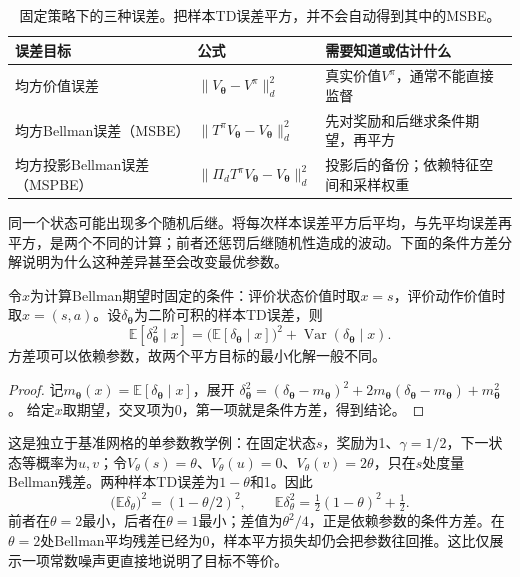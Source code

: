\begin{table}[t]
  \centering
  \small
  \begin{tabularx}{\linewidth}{>{\raggedright\arraybackslash}p{30mm} >{\raggedright\arraybackslash}X >{\raggedright\arraybackslash}X}
    \toprule
    误差目标 & 公式 & 需要知道或估计什么 \\
    \midrule
    均方价值误差 & $\lVert V_{\bm{\theta}}-V^\pi\rVert_d^2$ & 真实价值$V^\pi$，通常不能直接监督 \\
    均方Bellman误差（MSBE） & $\lVert T^\pi V_{\bm{\theta}}-V_{\bm{\theta}}\rVert_d^2$ & 先对奖励和后继求条件期望，再平方 \\
    均方投影Bellman误差（MSPBE） & $\lVert\Pi_dT^\pi V_{\bm{\theta}}-V_{\bm{\theta}}\rVert_d^2$ & 投影后的备份；依赖特征空间和采样权重 \\
    \bottomrule
  \end{tabularx}
  \caption{固定策略下的三种误差。把样本TD误差平方，并不会自动得到其中的MSBE。}
  \label{tab:rl-learning-value-objectives}
\end{table}

同一个状态可能出现多个随机后继。将每次样本误差平方后平均，与先平均误差再平方，是两个不同的计算；前者还惩罚后继随机性造成的波动。下面的条件方差分解说明为什么这种差异甚至会改变最优参数。

\begin{theorem}[样本平方误差的条件方差分解]
  \label{thm:rl-learning-td-variance}
  令$x$为计算Bellman期望时固定的条件：评价状态价值时取$x=s$，评价动作价值时取$x=(s,a)$。设$\delta_{\bm{\theta}}$为二阶可积的样本TD误差，则
  \begin{equation}
    \mathbb E[\delta_{\bm{\theta}}^2\mid x]
      =\bigl(\mathbb E[\delta_{\bm{\theta}}\mid x]\bigr)^2
          +\operatorname{Var}(\delta_{\bm{\theta}}\mid x).
    \label{eq:rl-learning-td-variance}
  \end{equation}
  方差项可以依赖参数，故两个平方目标的最小化解一般不同。
\end{theorem}
\begin{proof}
  记$m_{\bm{\theta}}(x)=\mathbb E[\delta_{\bm{\theta}}\mid x]$，展开
  $\delta_{\bm{\theta}}^2=(\delta_{\bm{\theta}}-m_{\bm{\theta}})^2
    +2m_{\bm{\theta}}(\delta_{\bm{\theta}}-m_{\bm{\theta}})
    +m_{\bm{\theta}}^2$。
  给定$x$取期望，交叉项为0，第一项就是条件方差，得到结论。
\end{proof}

\begin{example}[两个后继使最优参数改变]
  \label{ex:rl-learning-double-sampling}
  这是独立于基准网格的单参数教学例：在固定状态$s$，奖励为1、$\gamma=1/2$，下一状态等概率为$u,v$；令$V_\theta(s)=\theta$、$V_\theta(u)=0$、$V_\theta(v)=2\theta$，只在$s$处度量Bellman残差。两种样本TD误差为$1-\theta$和1。因此
  \[
    \bigl(\mathbb E\delta_\theta\bigr)^2=(1-\theta/2)^2,\qquad
    \mathbb E\delta_\theta^2=\tfrac12(1-\theta)^2+\tfrac12.
  \]
  前者在$\theta=2$最小，后者在$\theta=1$最小；差值为$\theta^2/4$，正是依赖参数的条件方差。在$\theta=2$处Bellman平均残差已经为0，样本平方损失却仍会把参数往回推。这比仅展示一项常数噪声更直接地说明了目标不等价。
\end{example}

